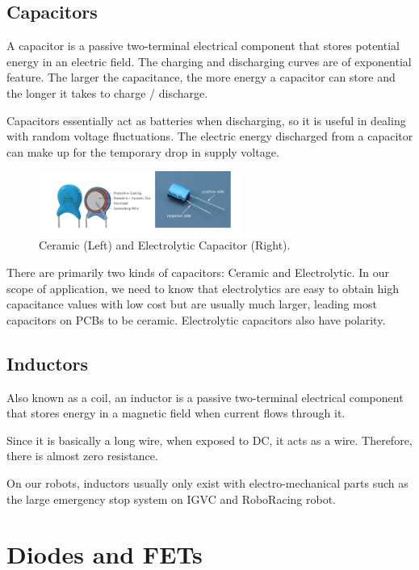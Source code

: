 \documentclass{article}
\begin{document}
\subsection{Capacitors}

A capacitor is a passive two-terminal electrical component that stores potential energy in an electric field. The charging and discharging curves are of exponential feature. The larger the capacitance, the more energy a capacitor can store and the longer it takes to charge / discharge. \par 
Capacitors essentially act as batteries when discharging, so it is useful in dealing with random voltage fluctuations. The electric energy discharged from a capacitor can make up for the temporary drop in supply voltage.

\begin{figure}[!h]
	\center
	\includegraphics[width=0.6\textwidth, keepaspectratio]{ceramicvelectro}
	\caption{Ceramic (Left) and Electrolytic Capacitor (Right).}
	\label{fig:capacitortype}
\end{figure}

There are primarily two kinds of capacitors: Ceramic and Electrolytic. In our scope of application, we need to know that electrolytics are easy to obtain high capacitance values with low cost but are usually much larger, leading most capacitors on PCBs to be ceramic. Electrolytic capacitors also have polarity.

\subsection{Inductors}

Also known as a coil, an inductor is a passive two-terminal electrical component that stores energy in a magnetic field when current flows through it. \par
Since it is basically a long wire, when exposed to DC, it acts as a wire. Therefore, there is almost zero resistance. \par
On our robots, inductors usually only exist with electro-mechanical parts such as the large emergency stop system on IGVC and RoboRacing robot.

\section{Diodes and FETs}
\end{document}
